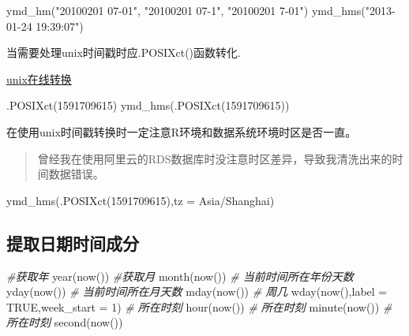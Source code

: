 \documentclass[
]{book}
\newenvironment{Shaded}{\begin{snugshade}}{\end{snugshade}}
\newcommand{\AttributeTok}[1]{\textcolor[rgb]{0.77,0.63,0.00}{#1}}
\newcommand{\CommentTok}[1]{\textcolor[rgb]{0.56,0.35,0.01}{\textit{#1}}}
\newcommand{\ConstantTok}[1]{\textcolor[rgb]{0.00,0.00,0.00}{#1}}
\newcommand{\DecValTok}[1]{\textcolor[rgb]{0.00,0.00,0.81}{#1}}
\newcommand{\FunctionTok}[1]{\textcolor[rgb]{0.00,0.00,0.00}{#1}}
\newcommand{\NormalTok}[1]{#1}
\newcommand{\StringTok}[1]{\textcolor[rgb]{0.31,0.60,0.02}{#1}}
\begin{document}
\begin{Shaded}
\begin{Highlighting}[]
\FunctionTok{ymd\_hm}\NormalTok{(}\StringTok{"20100201 07{-}01"}\NormalTok{, }\StringTok{"20100201 07{-}1"}\NormalTok{, }\StringTok{"20100201 7{-}01"}\NormalTok{)}
\FunctionTok{ymd\_hms}\NormalTok{(}\StringTok{"2013{-}01{-}24 19:39:07"}\NormalTok{)}
\end{Highlighting}
\end{Shaded}

当需要处理unix时间戳时应.POSIXct()函数转化.

\href{https://unixtime.51240.com/}{unix在线转换}

\begin{Shaded}
\begin{Highlighting}[]
\FunctionTok{.POSIXct}\NormalTok{(}\DecValTok{1591709615}\NormalTok{)}
\FunctionTok{ymd\_hms}\NormalTok{(}\FunctionTok{.POSIXct}\NormalTok{(}\DecValTok{1591709615}\NormalTok{))}
\end{Highlighting}
\end{Shaded}

在使用unix时间戳转换时一定注意R环境和数据系统环境时区是否一直。

\begin{quote}
曾经我在使用阿里云的RDS数据库时没注意时区差异，导致我清洗出来的时间数据错误。
\end{quote}

\begin{Shaded}
\begin{Highlighting}[]
\FunctionTok{ymd\_hms}\NormalTok{(}\FunctionTok{.POSIXct}\NormalTok{(}\DecValTok{1591709615}\NormalTok{),}\AttributeTok{tz =} \StringTok{\textquotesingle{}Asia/Shanghai\textquotesingle{}}\NormalTok{)}
\end{Highlighting}
\end{Shaded}

\hypertarget{lubridate:extracting-information}{%
\subsection{提取日期时间成分}\label{lubridate:extracting-information}}

\begin{Shaded}
\begin{Highlighting}[]
\CommentTok{\#获取年}
\FunctionTok{year}\NormalTok{(}\FunctionTok{now}\NormalTok{())  }
\CommentTok{\#获取月}
\FunctionTok{month}\NormalTok{(}\FunctionTok{now}\NormalTok{())}
\CommentTok{\# 当前时间所在年份天数}
\FunctionTok{yday}\NormalTok{(}\FunctionTok{now}\NormalTok{())}
\CommentTok{\# 当前时间所在月天数}
\FunctionTok{mday}\NormalTok{(}\FunctionTok{now}\NormalTok{())}
\CommentTok{\# 周几}
\FunctionTok{wday}\NormalTok{(}\FunctionTok{now}\NormalTok{(),}\AttributeTok{label =} \ConstantTok{TRUE}\NormalTok{,}\AttributeTok{week\_start =} \DecValTok{1}\NormalTok{)}
\CommentTok{\# 所在时刻}
\FunctionTok{hour}\NormalTok{(}\FunctionTok{now}\NormalTok{())}
\CommentTok{\# 所在时刻}
\FunctionTok{minute}\NormalTok{(}\FunctionTok{now}\NormalTok{())}
\CommentTok{\# 所在时刻}
\FunctionTok{second}\NormalTok{(}\FunctionTok{now}\NormalTok{())}
\end{Highlighting}
\end{Shaded}
\end{document}

